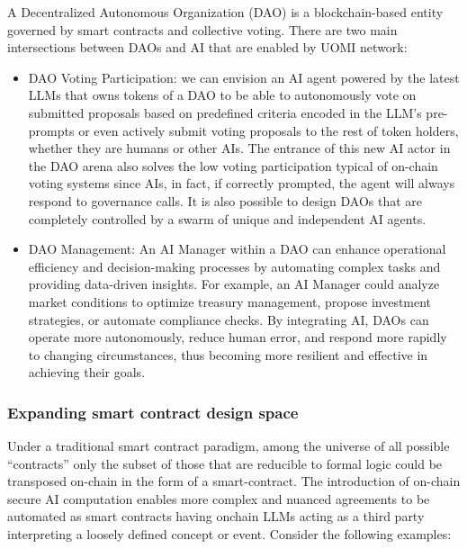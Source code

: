 \documentclass{article}
\begin{document}
A Decentralized Autonomous Organization (DAO) is a blockchain-based entity governed by smart contracts and collective voting. There are two main intersections between DAOs and AI that are enabled by UOMI network:

\begin{itemize}


\item DAO Voting Participation: we can envision an AI agent powered by the latest LLMs that owns tokens of a DAO to be able to autonomously vote on submitted proposals based on predefined criteria encoded in the LLM’s pre-prompts or even actively submit voting proposals to the rest of token holders, whether they are humans or other AIs. The entrance of this new AI actor in the DAO arena also solves the low voting participation typical of on-chain voting systems since AIs, in fact, if correctly prompted, the agent will always respond to governance calls. It is also possible to design DAOs that are completely controlled by a swarm of unique and independent AI agents. 


\item DAO Management: An AI Manager within a DAO can enhance operational efficiency and decision-making processes by automating complex tasks and providing data-driven insights. For example, an AI Manager could analyze market conditions to optimize treasury management, propose investment strategies, or automate compliance checks.  By integrating AI, DAOs can operate more autonomously, reduce human error, and respond more rapidly to changing circumstances, thus becoming more resilient and effective in achieving their goals.

\end{itemize}

\subsubsection{Expanding smart contract design space}

Under a traditional smart contract paradigm, among the universe of all possible “contracts” only the subset of those that are reducible to formal logic could be transposed on-chain in the form of a smart-contract. The introduction of on-chain secure AI computation enables more complex and nuanced agreements to be automated as smart contracts having onchain LLMs acting as a third party interpreting a loosely defined concept or event.
Consider the following examples:
\end{document}
